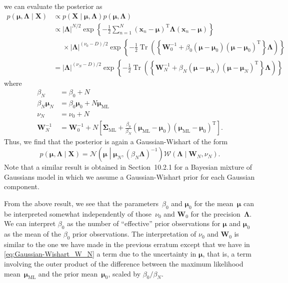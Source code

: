 \documentclass[12pt,a4paper]{article}
\begin{document}
we can evaluate the posterior as
\begin{align}
p\left(\bm{\mu}, \bm{\Lambda}\middle|\mathbf{X}\right) &\propto
p\left(\mathbf{X}\middle|\bm{\mu}, \bm{\Lambda}\right)
p\left(\bm{\mu}, \bm{\Lambda}\right) \\
&\propto
\left|\bm{\Lambda}\right|^{N/2}
\exp\left\{-\frac{1}{2}\sum_{n=1}^{N}
  \left(\mathbf{x}_n - \bm{\mu}\right)^{\operatorname{T}} \bm{\Lambda}
  \left(\mathbf{x}_n - \bm{\mu}\right)
\right\} \nonumber \\
&\phantom{\propto} \times
\left|\bm{\Lambda}\right|^{(\nu_0 - D)/2}
\exp\left\{-\frac{1}{2}\operatorname{Tr}\left(\left\{
\mathbf{W}_{0}^{-1} +
\beta_0\left(\bm{\mu} - \bm{\mu}_0\right)\left(\bm{\mu} - \bm{\mu}_0\right)^{\operatorname{T}}
\right\}\bm{\Lambda}\right)\right\}
\label{eq:Gaussian-Wishart_posterior_expanded} \\
&=
\left|\bm{\Lambda}\right|^{(\nu_N - D)/2}
\exp\left\{-\frac{1}{2}\operatorname{Tr}\left(\left\{
\mathbf{W}_{N}^{-1} +
\beta_N\left(\bm{\mu} - \bm{\mu}_N\right)\left(\bm{\mu} - \bm{\mu}_N\right)^{\operatorname{T}}
\right\}\bm{\Lambda}\right)\right\}
\end{align}
where
\begin{align}
\beta_N &= \beta_0 + N \\
\beta_N\bm{\mu}_N &= \beta_0\bm{\mu}_0 + N\bm{\mu}_{\text{ML}} \\
\nu_N &= \nu_0 + N \\
\mathbf{W}_{N}^{-1} &= \mathbf{W}_{0}^{-1} +
N \left[
\bm{\Sigma}_{\text{ML}} +
\frac{\beta_0}{\beta_N}
\left(\bm{\mu}_{\text{ML}} - \bm{\mu}_0\right)
\left(\bm{\mu}_{\text{ML}} - \bm{\mu}_0\right)^{\operatorname{T}}
\right] .
\label{eq:Gaussian-Wishart_W_N}
\end{align}
Thus, we find that the posterior is again a Gaussian-Wishart of the form
\begin{equation}
p\left(\bm{\mu}, \bm{\Lambda}\middle|\mathbf{X}\right) =
\mathcal{N}\left(\bm{\mu}\middle|\bm{\mu}_N, \left(\beta_N\bm{\Lambda}\right)^{-1}\right)
\mathcal{W}\left(\bm{\Lambda}\middle|\mathbf{W}_N, \nu_N\right) .
\end{equation}
Note that a similar result is obtained in Section~10.2.1 for a Bayesian mixture of Gaussians model
in which we assume a Gaussian-Wishart prior for each Gaussian component.

From the above result, we see that
the parameters~$\beta_0$ and $\bm{\mu}_0$ for the mean~$\bm{\mu}$ can be interpreted
somewhat independently of those~$\nu_0$ and $\mathbf{W}_0$ for the precision~$\bm{\Lambda}$.
We can interpret $\beta_0$ as the number of ``effective'' prior observations for $\bm{\mu}$ and
$\bm{\mu}_0$ as the mean of the $\beta_0$ prior observations.
The interpretation of $\nu_0$ and $\mathbf{W}_0$ is similar to
the one we have made in the previous erratum except that
we have in \eqref{eq:Gaussian-Wishart_W_N} a term due to the uncertainty in $\bm{\mu}$,
that is, a term involving the outer product of
the difference between the maximum likelihood mean~$\bm{\mu}_{\text{ML}}$ and
the prior mean~$\bm{\mu}_0$, scaled by $\beta_0/\beta_N$.
\end{document}
